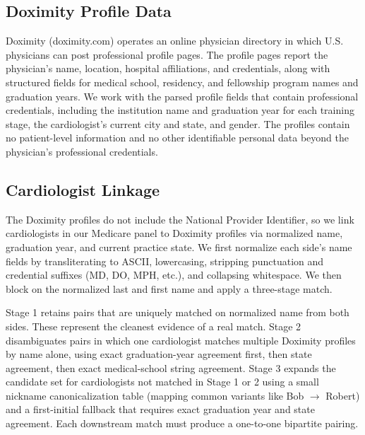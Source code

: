 \documentclass[12pt]{article}
\begin{document}
\subsection{Doximity Profile Data}

Doximity (doximity.com) operates an online physician directory in which U.S. physicians can post professional profile pages. The profile pages report the physician's name, location, hospital affiliations, and credentials, along with structured fields for medical school, residency, and fellowship program names and graduation years. We work with the parsed profile fields that contain professional credentials, including the institution name and graduation year for each training stage, the cardiologist's current city and state, and gender. The profiles contain no patient-level information and no other identifiable personal data beyond the physician's professional credentials.

\subsection{Cardiologist Linkage}

The Doximity profiles do not include the National Provider Identifier, so we link cardiologists in our Medicare panel to Doximity profiles via normalized name, graduation year, and current practice state. We first normalize each side's name fields by transliterating to ASCII, lowercasing, stripping punctuation and credential suffixes (MD, DO, MPH, etc.), and collapsing whitespace. We then block on the normalized last and first name and apply a three-stage match.

Stage 1 retains pairs that are uniquely matched on normalized name from both sides. These represent the cleanest evidence of a real match. Stage 2 disambiguates pairs in which one cardiologist matches multiple Doximity profiles by name alone, using exact graduation-year agreement first, then state agreement, then exact medical-school string agreement. Stage 3 expands the candidate set for cardiologists not matched in Stage 1 or 2 using a small nickname canonicalization table (mapping common variants like Bob $\rightarrow$ Robert) and a first-initial fallback that requires exact graduation year and state agreement. Each downstream match must produce a one-to-one bipartite pairing.
\end{document}
